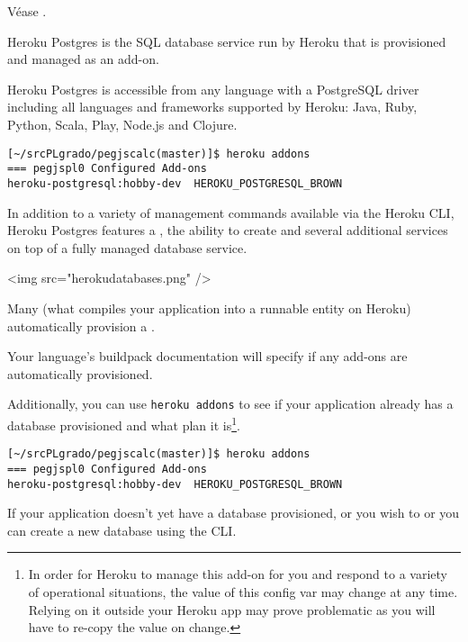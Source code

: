 Véase .

Heroku Postgres is the SQL database service run by Heroku that is
provisioned and managed as an add-on. 

Heroku Postgres is accessible
from any language with a PostgreSQL driver including all languages
and frameworks supported by Heroku: Java, Ruby, Python, Scala, Play,
Node.js and Clojure.

\begin{verbatim}
[~/srcPLgrado/pegjscalc(master)]$ heroku addons
=== pegjspl0 Configured Add-ons
heroku-postgresql:hobby-dev  HEROKU_POSTGRESQL_BROWN
\end{verbatim}

In addition to a variety of management commands available via the Heroku
CLI, Heroku Postgres features a 
, 
the ability to create
and several additional services on top of a fully managed
database service.

\begin{rawhtml}
<img src="herokudatabases.png" />
\end{rawhtml}

Many 
(what compiles your application into a runnable entity on
Heroku) automatically provision a . 

Your
language’s buildpack documentation will specify if any add-ons are
automatically provisioned. 

Additionally, you can use \verb|heroku addons| 
to
see if your application already has a database provisioned and what plan
it is\footnote{In order for Heroku to manage this add-on for you and
respond to a variety of operational situations, the value of this config
var may change at any time. Relying on it outside your Heroku app may
prove problematic as you will have to re-copy the value on change.}.

\begin{verbatim}
[~/srcPLgrado/pegjscalc(master)]$ heroku addons
=== pegjspl0 Configured Add-ons
heroku-postgresql:hobby-dev  HEROKU_POSTGRESQL_BROWN
\end{verbatim}

If your application doesn’t yet have a database provisioned, or you
wish to 
 or 
you can create a new database using the CLI.

